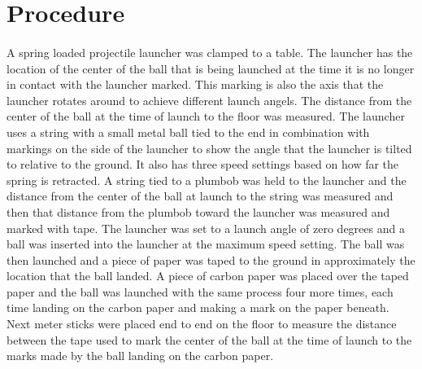 \documentclass[12pt]{article}
\begin{document}
    \section{Procedure}
        \paragraph{}A spring loaded projectile launcher was clamped to a table. The launcher has the location of the center of the 
        ball that is being launched at the time it is no longer in contact with the launcher marked. This marking is also 
        the axis that the launcher rotates around to achieve different launch angels. The distance from the center of the 
        ball at the time of launch to the floor was measured. The launcher uses a string 
        with a small metal ball tied to the end in combination with markings on the side of the launcher to show the angle 
        that the launcher is tilted to relative to the ground. It also has three speed settings based on how far the 
        spring is retracted. A string tied to a plumbob was held to the launcher and the 
        distance from the center of the ball at launch to the string was measured and then that distance from the plumbob 
        toward the launcher was measured and marked with tape. The launcher was set to a launch angle of zero degrees and 
        a ball was inserted into the launcher at the maximum speed setting. The ball was then launched and a piece of 
        paper was taped to the ground in approximately the location that the ball landed. A piece of carbon paper was 
        placed over the taped paper and the ball was launched with the same process four more times, each time landing 
        on the carbon paper and making a mark on the paper beneath. Next meter sticks were placed end to end on the floor 
        to measure the distance between the tape used to mark the center of the ball at the time of launch to the marks 
        made by the ball landing on the carbon paper. 
\end{document}
